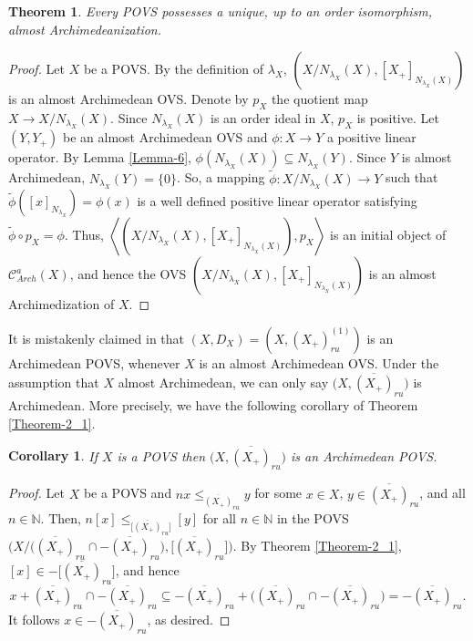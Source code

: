 \documentclass[10pt]{article}
\newtheorem{theorem}{Theorem}[section]
\newtheorem{corollary}{Corollary}[section]
\begin{document}
\begin{theorem}\label{Theorem-3_1}
Every POVS possesses a unique, up to an order isomorphism, almost Archime\-deanization.
\end{theorem}
 
\begin{proof}
Let $X$ be a POVS. By the definition of $\lambda_X$, $(X/N_{\lambda_X}(X),[X_+]_{N_{\lambda_X}(X)})$ is an almost Archimedean OVS. 
Denote by $p_X$ the quotient map $X\to X/N_{\lambda_X}(X)$. Since $N_{\lambda_X}(X)$ is an order ideal in $X$, $p_X$ is positive.
Let $(Y,Y_+)$ be an almost Archimedean OVS and $\phi:X\to Y$ a positive linear operator. By Lemma \ref{Lemma-6}, 
$\phi(N_{\lambda_X}(X))\subseteq N_{\lambda_X}(Y)$. Since $Y$ is almost Archimedean, $N_{\lambda_X}(Y)=\{0\}$.
So, a mapping $\tilde{\phi}:X/N_{\lambda_X}(X)\to Y$ 
such that $\tilde{\phi}([x]_{N_{\lambda_X}})=\phi(x)$ is a well defined positive linear operator satisfying $\tilde{\phi}\circ p_X=\phi$. 
Thus, $\left\langle(X/N_{\lambda_X}(X),[X_+]_{N_{\lambda_X}(X)}),p_X\right\rangle$ is an initial object of $\mathcal{C}^a_{Arch}(X)$,
and hence the OVS $(X/N_{\lambda_X}(X),[X_+]_{N_{\lambda_X}(X)})$ is an almost Archimedization of $X$.
\end{proof}

It is mistakenly claimed in \cite[Proposition 3.4]{E-2017} that $(X,D_X)=(X,(X_+)^{(1)}_{ru})$ is an Archimede\-an POVS,
whenever $X$ is an almost Archimedean OVS. Under the assumption that $X$ almost Archimedean, 
we can only say $\big(X,\overline{(X_+)}_{ru}\big)$ is Archimedean.
More precisely, we have the following corollary of Theorem \ref{Theorem-2_1}.

\begin{corollary}\label{Corollary-3_1}
If $X$ is a POVS then $\big(X,\overline{(X_+)}_{ru}\big)$ is an Archimedean POVS.
\end{corollary}

\begin{proof}
Let $X$ be a POVS and $nx\leqslant_{\overline{(X_+)}_{ru}}y$ for some $x\in X$, $y\in \overline{(X_+)}_{ru}$, and all $n\in\mathbb{N}$. Then,
$n[x]\leqslant_{\big[\overline{(X_+)}_{ru}\big]}[y]$ for all $n\in\mathbb{N}$ 
in the POVS $\big(X/\big(\overline{(X_+)}_{ru}\cap-\overline{(X_+)}_{ru}\big),\big[\overline{(X_+)}_{ru}\big]\big)$. 
By Theorem \ref{Theorem-2_1}, $[x]\in-\big[\overline{(X_+)}_{ru}\big]$, and hence 
$$
   x+\overline{(X_+)}_{ru}\cap-\overline{(X_+)}_{ru}\subseteq-\overline{(X_+)}_{ru}+\big(\overline{(X_+)}_{ru}\cap-\overline{(X_+)}_{ru}\big)=-\overline{(X_+)}_{ru}. 
$$
It follows $x\in -\overline{(X_+)}_{ru}$, as desired.
\end{proof}
\end{document}
